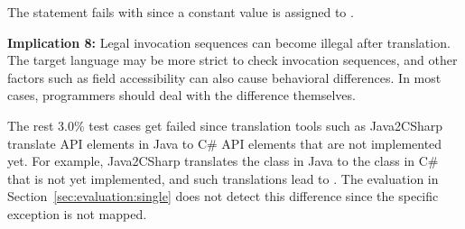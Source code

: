 The  statement fails with  since a constant value is assigned to .

\textbf{Implication 8:} Legal invocation sequences can become illegal after translation. The target language may be more strict to check invocation sequences, and other factors such as field accessibility can also cause behavioral differences. In most cases, programmers should deal with the difference themselves.

The rest 3.0\% test cases get failed since translation tools such as Java2CSharp translate API elements in Java to C\# API elements that are not implemented yet. For example, Java2CSharp translates the  class in Java to the  class in C\# that is not yet implemented, and such translations lead to . The evaluation in Section~\ref{sec:evaluation:single} does not detect this difference since the specific exception is not mapped.

